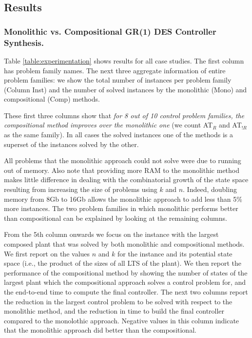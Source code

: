 \subsection{Results}

\subsubsection{Monolithic vs. Compositional   GR(1) DES Controller Synthesis.} 

Table \ref{table:experimentation} shows results for all case studies.  The first column has problem family names. The next three aggregate information of entire problem families: we show the total number of instances per problem family (Column Inst) and the number of solved instances by the monolithic (Mono) and compositional (Comp) methods. 

These first three columns show that \textit{for 8 out of 10 control problem families, the compositional method improves over the monolithic one} (we count AT$_R$ and AT$_{!R}$ as the same family). 
In all cases the solved instances one of the methods is a superset of the instances solved by the other. 

All problems that the monolithic approach could not solve were due to running out of memory. Also note that providing more RAM to the monolithic method makes little difference in dealing with the combinatorial growth of the state space resulting from increasing the size of problems using $k$ and $n$. Indeed, doubling memory from 8Gb to 16Gb allows the monolithic approach to add less than 5\% more instances. The two problem families in which monolithic performs better than compositional can be explained by looking at the remaining columns.


From the 5th column onwards we focus on the instance with the largest composed plant that was solved by both monolithic and compositional methods. We first report on the values $n$ and $k$ for the instance and its potential state space (i.e., the product of the sizes of all LTS of the plant).
We then report the performance of the compositional method by showing the number of states of the largest plant which the compositional approach solves a control problem for, and the end-to-end time to compute the final controller. The next two columns report the reduction in the largest control problem to be solved with respect to the monolithic method, and the reduction in time to build the final controller compared to the monolothic approach. Negative values in this column indicate that the monolithic approach did better than the compositional.

